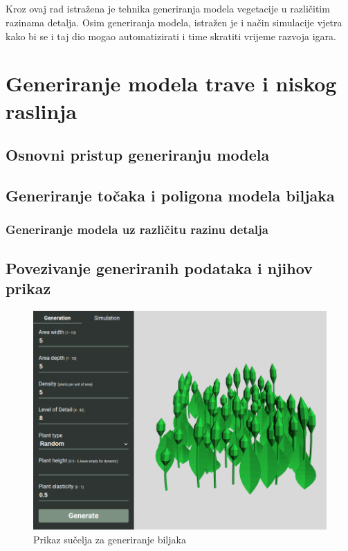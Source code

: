 \documentclass[times, utf8, diplomski]{fer}
\begin{document}
\paragraph{}
Kroz ovaj rad istražena je tehnika generiranja modela vegetacije u različitim razinama 
detalja. Osim generiranja modela, istražen je i način simulacije vjetra kako bi se i taj dio 
mogao automatizirati i time skratiti vrijeme razvoja igara.


\chapter{Generiranje modela trave i niskog raslinja}
\section{Osnovni pristup generiranju modela}

\section{Generiranje točaka i poligona modela biljaka}

\subsection{Generiranje modela uz različitu razinu detalja}

\section{Povezivanje generiranih podataka i njihov prikaz}
\begin{figure}[h]
	\centering
	\includegraphics[width=1\textwidth]{img/21-5}
	\caption{Prikaz sučelja za generiranje biljaka}
	\label{fig:21-5}
\end{figure}
\end{document}

